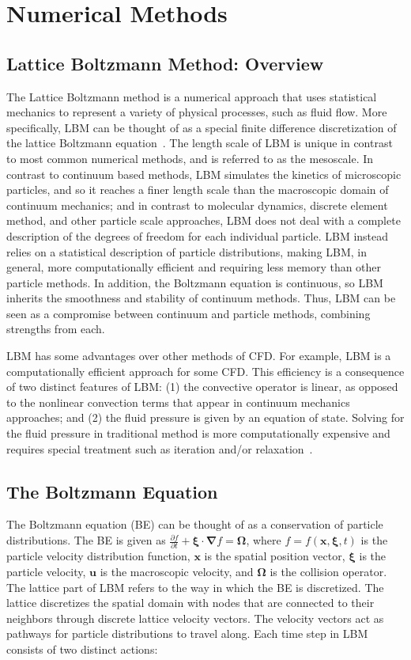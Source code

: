 \documentclass{article}
\newcommand{\pos}{\mathbf{x}}
\newcommand{\pvel}{\boldsymbol{\xi}}
\newcommand{\mvel}{\mathbf{u}}
\newcommand{\colop}{\boldsymbol{\Omega}}
\newcommand{\grad}{\boldsymbol{\nabla}}
\begin{document}
\section{Numerical Methods}

\subsection{Lattice Boltzmann Method: Overview}

The Lattice Boltzmann method is a numerical approach that uses statistical mechanics to represent a variety of physical processes, such as fluid flow.
More specifically, LBM can be thought of as a special finite difference discretization of the lattice Boltzmann equation~\cite{chen1998lattice}.
The length scale of LBM is unique in contrast to most common numerical methods, and is referred to as the mesoscale.
In contrast to continuum based methods, LBM simulates the kinetics of microscopic particles, and so it reaches a finer length scale than the macroscopic domain of continuum mechanics; and in contrast to molecular dynamics, discrete element method, and other particle scale approaches, LBM does not deal with a complete description of the degrees of freedom for each individual particle.
LBM instead relies on a statistical description of particle distributions, making LBM, in general, more computationally efficient and requiring less memory than other particle methods.
In addition, the Boltzmann equation is continuous, so LBM inherits the smoothness and stability of continuum methods.
Thus, LBM can be seen as a compromise between continuum and particle methods, combining strengths from each.

LBM has some advantages over other methods of CFD.
For example, LBM is a computationally efficient approach for some CFD.
This efficiency is a consequence of two distinct features of LBM: (1) the convective operator is linear, as opposed to the nonlinear convection terms that appear in continuum mechanics approaches; and (2) the fluid pressure is given by an equation of state.
Solving for the fluid pressure in traditional method is more computationally expensive and requires special treatment such as iteration and/or relaxation~\cite{chen1998lattice}.

\subsection{The Boltzmann Equation}
The Boltzmann equation (BE) can be thought of as a conservation of particle distributions.
The BE is given as $\frac{\partial f}{\partial t} + \pvel \cdot \grad f = \colop$, where $f = f(\pos, \pvel, t)$ is the particle velocity distribution function, $\pos$ is the spatial position vector, $\pvel$ is the particle velocity, $\mvel$ is the macroscopic velocity, and $\colop$ is the collision operator.
The lattice part of LBM refers to the way in which the BE is discretized.
The lattice discretizes the spatial domain with nodes that are connected to their neighbors through discrete lattice velocity vectors.
The velocity vectors act as pathways for particle distributions to travel along.
Each time step in LBM consists of two distinct actions:
\end{document}
